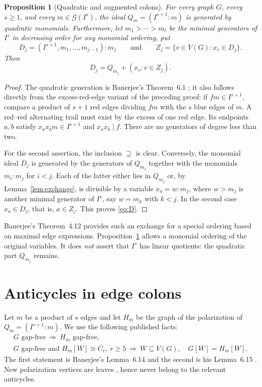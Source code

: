 \documentclass[11pt,a4paper]{article}
\newtheorem{proposition}[theorem]{Proposition}
\theoremstyle{remark}\newtheorem{remark}[theorem]{Remark}
\newcommand{\GG}{\mathcal G}
\begin{document}
\begin{proposition}[Quadratic and augmented colons]\label{prop:colons}
For every graph $G$, every $s\ge1$, and every $m\in\GG(I^s)$, the ideal $Q_m=(I^{s+1}:m)$ is generated by quadratic monomials. Furthermore, let $m_1>\cdots>m_t$ be the minimal generators of $I^s$ in decreasing order for \emph{any} monomial ordering, put
\[
 D_j=(I^{s+1},m_1,\ldots,m_{j-1}):m_j
 \qquad\text{and}\qquad
 Z_j=\{v\in V(G):x_v\in D_j\}.
\]
Then
\begin{equation}\label{eq:D}
 D_j=Q_{m_j}+(x_v:v\in Z_j).
\end{equation}
\end{proposition}
\begin{proof}
The quadratic generation is Banerjee's Theorem~6.1 \cite{Banerjee}; it also follows directly from the excess-red-edge variant of the preceding proof: if $f m\in I^{s+1}$, compare a product of $s+1$ red edges dividing $fm$ with the $s$ blue edges of $m$. A red--red alternating trail must exist by the excess of one red edge. Its endpoints $a,b$ satisfy $x_ax_bm\in I^{s+1}$ and $x_ax_b\mid f$. There are no generators of degree less than two.

For the second assertion, the inclusion $\supseteq$ is clear. Conversely, the monomial ideal $D_j$ is generated by the generators of $Q_{m_j}$ together with the monomials $m_i:m_j$ for $i<j$. Each of the latter either lies in $Q_{m_j}$ or, by Lemma~\ref{lem:exchange}, is divisible by a variable $x_a=w:m_j$, where $w>m_j$ is another minimal generator of $I^s$, say $w=m_k$ with $k<j$. In the second case $x_a\in D_j$, that is, $a\in Z_j$. This proves \eqref{eq:D}.
\end{proof}

Banerjee's Theorem~4.12 \cite{Banerjee} provides such an exchange for a special ordering based on maximal edge expressions. Proposition~\ref{prop:colons} allows a monomial ordering of the original variables. It does \emph{not} assert that $I^s$ has linear quotients: the quadratic part $Q_{m_j}$ remains.

\section{Anticycles in edge colons}\label{sec:anticycles}
Let $m$ be a product of $s$ edges and let $H_m$ be the graph of the polarization of $Q_m=(I^{s+1}:m)$. We use the following published facts:
\begin{equation}\label{eq:Ban}
\begin{gathered}
 G\text{ gap-free}\ \Longrightarrow\ H_m\text{ gap-free},\\
 G\text{ gap-free and } H_m[W]\cong\overline{C_r},\ r\ge5\ \Longrightarrow\
 W\subseteq V(G),\quad G[W]=H_m[W].
\end{gathered}
\end{equation}
The first statement is Banerjee's Lemma~6.14 and the second is his Lemma~6.15 \cite{Banerjee}. New polarization vertices are leaves \cite[Lemma 6.11]{Banerjee}, hence never belong to the relevant anticycles.
\end{document}
